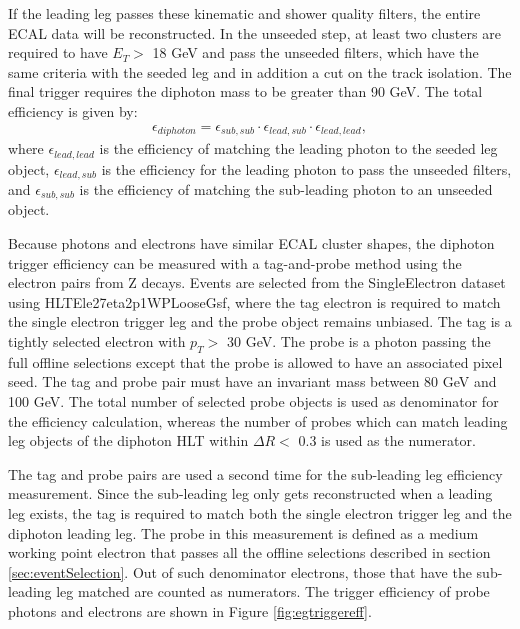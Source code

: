 \documentclass[thesis.tex]{subfiles}
\renewcommand\_{\textunderscore\allowbreak}
\begin{document}
If the leading leg passes these kinematic and shower quality filters, the entire ECAL data will be reconstructed. 
In the unseeded step, at least two clusters are required to have $E_T > $ 18 GeV and pass the unseeded filters, which have the same criteria with the seeded leg and in addition a cut on the track isolation. 
The final trigger requires the diphoton mass to be greater than 90 GeV. The total efficiency is given by:
\begin{eqnarray*}
	\epsilon_{diphoton} = \epsilon_{sub, sub} \cdot \epsilon_{lead, sub} \cdot \epsilon_{lead, lead},
\end{eqnarray*}
where $\epsilon_{lead, lead}$ is the efficiency of matching the leading photon to the seeded leg object, $\epsilon_{lead, sub}$ is the efficiency for the leading photon to pass the unseeded filters, and $ \epsilon_{sub, sub}$ is the efficiency of matching the sub-leading photon to an unseeded object. 

Because photons and electrons have similar ECAL cluster shapes, the diphoton trigger efficiency can be measured with a tag-and-probe method using the electron pairs from Z decays. 
Events are selected from the SingleElectron dataset using HLT\_Ele27\_eta2p1\_WPLoose\_Gsf, where the tag electron is required to match the single electron trigger leg and the probe object remains unbiased. 
The tag is a tightly selected electron with $p_T >$ 30 GeV.  
The probe is a photon passing the full offline selections except that the probe is allowed to have an associated pixel seed.
The tag and probe pair must have an invariant mass between 80 GeV and 100 GeV. 
The total number of selected probe objects is used as denominator for the efficiency calculation, whereas the number of probes which can match leading leg objects of the diphoton HLT within $\Delta R <$ 0.3 is used as the numerator. 

The tag and probe pairs are used a second time for the sub-leading leg efficiency measurement. 
Since the sub-leading leg only gets reconstructed when a leading leg exists, the tag is required to match both the single electron trigger leg and the diphoton leading leg. 
The probe in this measurement is defined as a medium working point electron that passes all the offline selections described in section \ref{sec:eventSelection}. 
Out of such denominator electrons, those that have the sub-leading leg matched are counted as numerators. 
The trigger efficiency of probe photons and electrons are shown in Figure \ref{fig:egtriggereff}.
\end{document}
